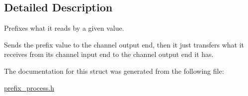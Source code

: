 \subsection{Detailed Description}
Prefixes what it reads by a given value. 

Sends the prefix value to the channel output end, then it just transfers what it receives from its channel input end to the channel output end it has. 

The documentation for this struct was generated from the following file\-:\begin{DoxyCompactItemize}
\item 
\hyperlink{prefix__process_8h}{prefix\-\_\-process.\-h}\end{DoxyCompactItemize}
